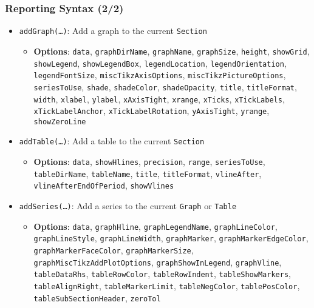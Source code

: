 \documentclass[10pt]{beamer}
\newcommand{\myitem}{\item[$\bullet$]}
\begin{document}
\begin{frame}
  \frametitle{Reporting Syntax (2/2)}
  \begin{itemize}
  \myitem \texttt{addGraph(\ldots)}: Add a graph to the current \texttt{Section}
    \begin{itemize}
    \myitem \textbf{Options}: \texttt{data}, \texttt{graphDirName}, \texttt{graphName}, \texttt{graphSize}, \texttt{height}, \texttt{showGrid}, \texttt{showLegend}, \texttt{showLegendBox}, \texttt{legendLocation}, \texttt{legendOrientation}, \texttt{legendFontSize}, \texttt{miscTikzAxisOptions}, \texttt{miscTikzPictureOptions}, \texttt{seriesToUse}, \texttt{shade}, \texttt{shadeColor}, \texttt{shadeOpacity}, \texttt{title}, \texttt{titleFormat}, \texttt{width}, \texttt{xlabel}, \texttt{ylabel}, \texttt{xAxisTight}, \texttt{xrange}, \texttt{xTicks}, \texttt{xTickLabels}, \texttt{xTickLabelAnchor}, \texttt{xTickLabelRotation}, \texttt{yAxisTight}, \texttt{yrange}, \texttt{showZeroLine}
    \end{itemize}
  \myitem \texttt{addTable(\ldots)}: Add a table to the current \texttt{Section}
    \begin{itemize}
    \myitem \textbf{Options}: \texttt{data}, \texttt{showHlines}, \texttt{precision}, \texttt{range}, \texttt{seriesToUse}, \texttt{tableDirName}, \texttt{tableName}, \texttt{title}, \texttt{titleFormat}, \texttt{vlineAfter}, \texttt{vlineAfterEndOfPeriod}, \texttt{showVlines}
    \end{itemize}
  \myitem \texttt{addSeries(\ldots)}: Add a series to the current \texttt{Graph} or \texttt{Table}
    \begin{itemize}
    \myitem \textbf{Options}: \texttt{data}, \texttt{graphHline}, \texttt{graphLegendName}, \texttt{graphLineColor}, \texttt{graphLineStyle}, \texttt{graphLineWidth}, \texttt{graphMarker}, \texttt{graphMarkerEdgeColor}, \texttt{graphMarkerFaceColor}, \texttt{graphMarkerSize}, \texttt{graphMiscTikzAddPlotOptions}, \texttt{graphShowInLegend}, \texttt{graphVline}, \texttt{tableDataRhs}, \texttt{tableRowColor}, \texttt{tableRowIndent}, \texttt{tableShowMarkers}, \texttt{tableAlignRight}, \texttt{tableMarkerLimit}, \texttt{tableNegColor}, \texttt{tablePosColor}, \texttt{tableSubSectionHeader}, \texttt{zeroTol}
    \end{itemize}
  \end{itemize}
\end{frame}
\end{document}
